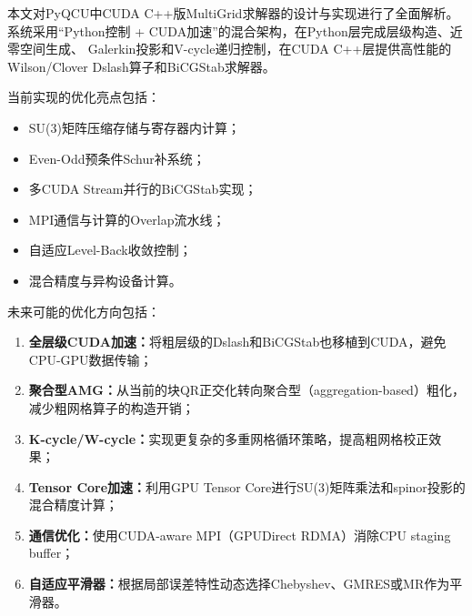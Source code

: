\documentclass[11pt,a4paper]{article}
\begin{document}
本文对PyQCU中CUDA C++版MultiGrid求解器的设计与实现进行了全面解析。
系统采用``Python控制 + CUDA加速''的混合架构，在Python层完成层级构造、近零空间生成、
Galerkin投影和V-cycle递归控制，在CUDA C++层提供高性能的Wilson/Clover Dslash算子和BiCGStab求解器。

当前实现的优化亮点包括：
\begin{itemize}
    \item SU(3)矩阵压缩存储与寄存器内计算；
    \item Even-Odd预条件Schur补系统；
    \item 多CUDA Stream并行的BiCGStab实现；
    \item MPI通信与计算的Overlap流水线；
    \item 自适应Level-Back收敛控制；
    \item 混合精度与异构设备计算。
\end{itemize}

未来可能的优化方向包括：
\begin{enumerate}
    \item \textbf{全层级CUDA加速：}将粗层级的Dslash和BiCGStab也移植到CUDA，避免CPU-GPU数据传输；
    \item \textbf{聚合型AMG：}从当前的块QR正交化转向聚合型（aggregation-based）粗化，减少粗网格算子的构造开销；
    \item \textbf{K-cycle/W-cycle：}实现更复杂的多重网格循环策略，提高粗网格校正效果；
    \item \textbf{Tensor Core加速：}利用GPU Tensor Core进行SU(3)矩阵乘法和spinor投影的混合精度计算；
    \item \textbf{通信优化：}使用CUDA-aware MPI（GPUDirect RDMA）消除CPU staging buffer；
    \item \textbf{自适应平滑器：}根据局部误差特性动态选择Chebyshev、GMRES或MR作为平滑器。
\end{enumerate}
\end{document}

